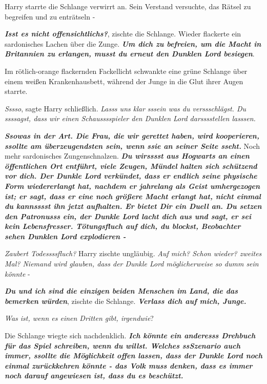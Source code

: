 Harry starrte die Schlange verwirrt an. Sein Verstand versuchte, das Rätsel zu
begreifen und zu enträtseln -

\glqq{}\textbf{\emph{Isst es nicht offensichtlichs?}}\grqq{}, zischte die
Schlange. Wieder flackerte ein sardonisches Lachen über die Zunge. \glqq{}
\textbf{\emph{Um dich zu befreien, um die Macht in Britannien zu erlangen, musst
du erneut den Dunklen Lord besiegen}}.\grqq{}

Im rötlich-orange flackernden Fackellicht schwankte eine grüne Schlange über
einem weißen Krankenhausbett, während der Junge in die Glut ihrer Augen starrte.

\glqq{}\emph{Sssso}\grqq{}, sagte Harry schließlich. \glqq{}\emph{Lasss uns klar
sssein was du verssschlägst. Du ssssagst, dass wir einen Schausssspieler den
Dunklen Lord darsssstellen lasssen.}\grqq{}

\glqq{}\textbf{\emph{Ssowas in der Art. Die Frau, die wir gerettet haben, wird
kooperieren, ssollte am überzeugendsten sein, wenn ssie an seiner Seite
sseht.}}\grqq{} Noch mehr sardonisches Zungenschnalzen. \glqq{}\textbf{\emph{Du
wirsssst aus Hogwarts an einen öffentlichen Ort entführt, viele Zeugen, Mündel
halten sich schützend vor dich. Der Dunkle Lord verkündet, dass er endlich seine
physische Form wiedererlangt hat, nachdem er jahrelang als Geist umhergezogen
ist; er sagt, dass er eine noch größere Macht erlangt hat, nicht einmal du
kannsssst ihn jetzt aufhalten. Er bietet Dir ein Duell an. Du setzen den
Patronusss ein, der Dunkle Lord lacht dich aus und sagt, er sei kein
Lebensfresser. Tötungsfluch auf dich, du blockst, Beobachter sehen Dunklen Lord
explodieren -}}\grqq{}

\glqq{}\emph{Zaubert Todessssfluch?}\grqq{} Harry zischte ungläubig. \glqq{}
\emph{Auf mich? Schon wieder? zweites Mal? Niemand wird glauben, dass der Dunkle
Lord möglicherweise so dumm sein könnte} -\grqq{}

\glqq{}\textbf{\emph{Du und ich sind die einzigen beiden Menschen im Land, die
das bemerken würden}}\grqq{}, zischte die Schlange. \glqq{}\textbf{\emph{Verlass
dich auf mich, Junge.}}\grqq{}

\glqq{}\emph{Was ist, wenn es einen Dritten gibt, irgendwie}?\grqq{}

Die Schlange wiegte sich nachdenklich. \glqq{}\textbf{\emph{Ich könnte ein
anderesss Drehbuch für das Spiel schreiben, wenn du willst. Welches ssSzenario
auch immer, ssollte die Möglichkeit offen lassen, dass der Dunkle Lord noch
einmal zurückkehren könnte - das Volk muss denken, dass es immer noch darauf
angewiesen ist, dass du es beschützt.\grqq{}} }


